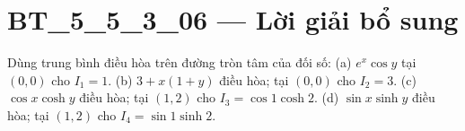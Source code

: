 \documentclass[10pt,a4paper]{article}
\begin{document}
\section*{BT\_5\_5\_3\_06 — Lời giải bổ sung}
Dùng trung bình điều hòa trên đường tròn tâm của đối số:
(a) $e^x\cos y$ tại $(0,0)$ cho $I_1=1$.
(b) $3+x(1+y)$ điều hòa; tại $(0,0)$ cho $I_2=3$.
(c) $\cos x\cosh y$ điều hòa; tại $(1,2)$ cho $I_3=\cos1\cosh2$.
(d) $\sin x\sinh y$ điều hòa; tại $(1,2)$ cho $I_4=\sin1\sinh2$.
\end{document}
